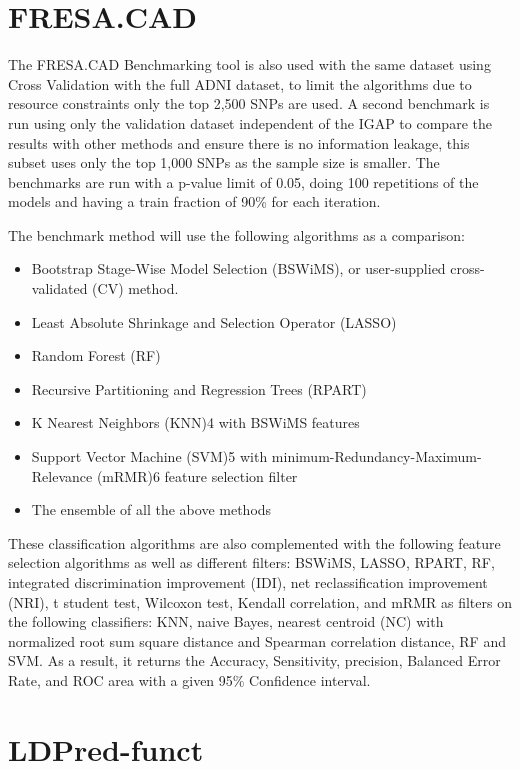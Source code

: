 \section{FRESA.CAD}


The FRESA.CAD Benchmarking tool is also used with the same dataset using Cross Validation with the full ADNI dataset, to limit the algorithms due to resource constraints only the top 2,500 SNPs are used. A second benchmark is run using only the validation dataset independent of the IGAP to compare the results with other methods and ensure there is no information leakage, this subset uses only the top 1,000 SNPs as the sample size is smaller. The benchmarks are run with a p-value limit of 0.05, doing 100 repetitions of the models and having a train fraction of 90\% for each iteration.

The benchmark method will use the following algorithms as a comparison:

\begin{itemize}
    \item{Bootstrap Stage-Wise Model Selection (BSWiMS), or user-supplied cross-validated (CV) method.}
    \item{Least Absolute Shrinkage and Selection Operator (LASSO)} 
    \item{Random Forest (RF)} 
    \item{Recursive Partitioning and Regression Trees (RPART)}
    \item{K Nearest Neighbors (KNN)4 with BSWiMS features} 
    \item{Support Vector Machine (SVM)5 with minimum-Redundancy-Maximum-Relevance (mRMR)6 feature selection filter} 
    \item{The ensemble of all the above methods}
\end{itemize}

These classification algorithms are also complemented with the following feature selection algorithms as well as different filters: BSWiMS, LASSO, RPART, RF, integrated discrimination improvement (IDI), net reclassification improvement (NRI), t student test, Wilcoxon test, Kendall correlation, and mRMR as filters on the following classifiers: KNN, naive Bayes, nearest centroid (NC) with normalized root sum square distance and Spearman correlation distance, RF and  SVM. As a result, it returns the Accuracy, Sensitivity, precision, Balanced Error Rate, and ROC area with a given 95\% Confidence interval.

\section{LDPred-funct}

